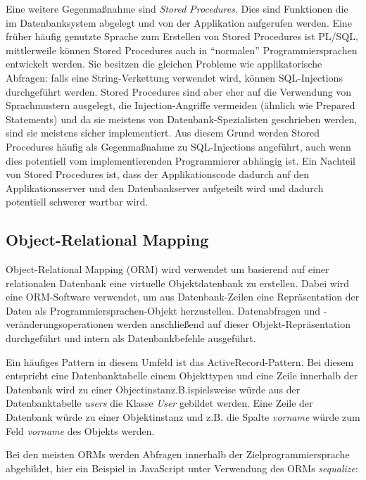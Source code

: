 Eine weitere Gegenmaßnahme sind \textit{Stored Procedures}. Dies sind Funktionen die im Datenbanksystem abgelegt und von der Applikation aufgerufen werden. Eine früher häufig genutzte Sprache zum Erstellen von Stored Procedures ist PL/SQL, mittlerweile können Stored Procedures auch in ``normalen'' Programmiersprachen entwickelt werden. Sie besitzen die gleichen Probleme wie applikatorische Abfragen: falls eine String-Verkettung verwendet wird, können SQL-Injections durchgeführt werden. Stored Procedures sind aber eher auf die Verwendung von Sprachmustern ausgelegt, die Injection-Angriffe vermeiden (ähnlich wie Prepared Statements) und da sie meistens von Datenbank-Spezialisten geschrieben werden, sind sie meistens sicher implementiert. Aus diesem Grund werden Stored Procedures häufig als Gegenmaßnahme zu SQL-Injections angeführt, auch wenn dies potentiell vom implementierenden Programmierer abhängig ist. Ein Nachteil von Stored Procedures ist, dass der Applikationscode dadurch auf den Applikationsserver und den Datenbankserver aufgeteilt wird und dadurch potentiell schwerer wartbar wird.

\subsection{Object-Relational Mapping}

Object-Relational Mapping (ORM) wird verwendet um basierend auf einer relationalen Datenbank eine virtuelle Objektdatenbank zu erstellen. Dabei wird eine ORM-Software verwendet, um aus Datenbank-Zeilen eine Repräsentation der Daten als Programmiersprachen-Objekt herzustellen. Datenabfragen und -veränderungsoperationen werden anschließend auf dieser Objekt-Repräsentation durchgeführt und intern als Datenbankbefehle ausgeführt.

Ein häufiges Pattern in diesem Umfeld ist das ActiveRecord-Pattern. Bei diesem entspricht eine Datenbanktabelle einem Objekttypen und eine Zeile innerhalb der Datenbank wird zu einer Objectinstanz.B.ispielsweise würde aus der Datenbanktabelle \textit{users} die Klasse \textit{User} gebildet werden. Eine Zeile der Datenbank würde zu einer Objektinstanz und z.B. die Spalte \textit{vorname} würde zum Feld \textit{vorname} des Objekts werden.

Bei den meisten ORMs werden Abfragen innerhalb der Zielprogrammiersprache abgebildet, hier ein Beispiel in JavaScript unter Verwendung des ORMs \textit{sequalize}:

